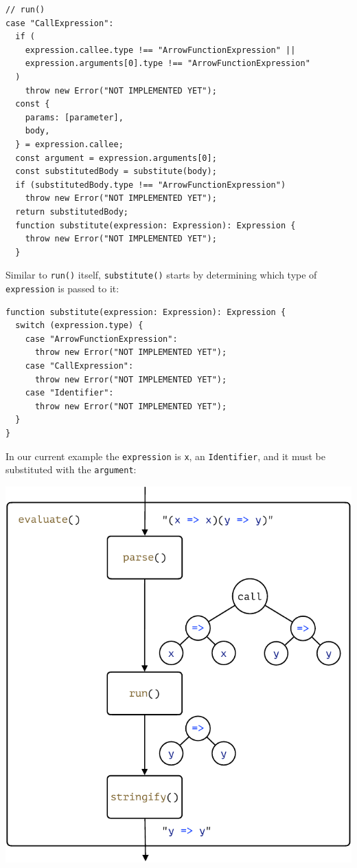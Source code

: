 \documentclass[12pt, oneside]{book}
\begin{document}
\begin{verbatim}
// run()
case "CallExpression":
  if (
    expression.callee.type !== "ArrowFunctionExpression" ||
    expression.arguments[0].type !== "ArrowFunctionExpression"
  )
    throw new Error("NOT IMPLEMENTED YET");
  const {
    params: [parameter],
    body,
  } = expression.callee;
  const argument = expression.arguments[0];
  const substitutedBody = substitute(body);
  if (substitutedBody.type !== "ArrowFunctionExpression")
    throw new Error("NOT IMPLEMENTED YET");
  return substitutedBody;
  function substitute(expression: Expression): Expression {
    throw new Error("NOT IMPLEMENTED YET");
  }
\end{verbatim}

Similar to \texttt{run()} itself, \texttt{substitute()} starts by determining which type of \texttt{expression} is passed to it:

\begin{verbatim}
function substitute(expression: Expression): Expression {
  switch (expression.type) {
    case "ArrowFunctionExpression":
      throw new Error("NOT IMPLEMENTED YET");
    case "CallExpression":
      throw new Error("NOT IMPLEMENTED YET");
    case "Identifier":
      throw new Error("NOT IMPLEMENTED YET");
  }
}
\end{verbatim}

In our current example the \texttt{expression} is \texttt{x}, an \texttt{Identifier}, and it must be substituted with the \texttt{argument}:

\begin{center}
\includegraphics[page = 5]{images.pdf}
\end{center}
\end{document}
